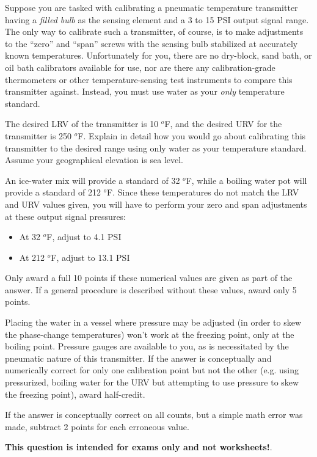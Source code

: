 

Suppose you are tasked with calibrating a pneumatic temperature transmitter having a {\it filled bulb} as the sensing element and a 3 to 15 PSI output signal range.  The only way to calibrate such a transmitter, of course, is to make adjustments to the ``zero'' and ``span'' screws with the sensing bulb stabilized at accurately known temperatures.  Unfortunately for you, there are no dry-block, sand bath, or oil bath calibrators available for use, nor are there any calibration-grade thermometers or other temperature-sensing test instruments to compare this transmitter against.  Instead, you must use water as your {\it only} temperature standard.

\vskip 10pt

The desired LRV of the transmitter is 10 $^{o}$F, and the desired URV for the transmitter is 250 $^{o}$F.  Explain in detail how you would go about calibrating this transmitter to the desired range using only water as your temperature standard.  Assume your geographical elevation is sea level.

\vskip 50pt







An ice-water mix will provide a standard of 32 $^{o}$F, while a boiling water pot will provide a standard of 212 $^{o}$F.  Since these temperatures do not match the LRV and URV values given, you will have to perform your zero and span adjustments at these output signal pressures:

\begin{itemize}
\item{} At 32 $^{o}$F, adjust to 4.1 PSI
\vskip 5pt
\item{} At 212 $^{o}$F, adjust to 13.1 PSI
\end{itemize}

Only award a full 10 points if these numerical values are given as part of the answer.  If a general procedure is described without these values, award only 5 points.

\vskip 10pt

Placing the water in a vessel where pressure may be adjusted (in order to skew the phase-change temperatures) won't work at the freezing point, only at the boiling point.  Pressure gauges are available to you, as is necessitated by the pneumatic nature of this transmitter.  If the answer is conceptually and numerically correct for only one calibration point but not the other (e.g. using pressurized, boiling water for the URV but attempting to use pressure to skew the freezing point), award half-credit.

\vskip 10pt

If the answer is conceptually correct on all counts, but a simple math error was made, subtract 2 points for each erroneous value.







{\bf This question is intended for exams only and not worksheets!}.


